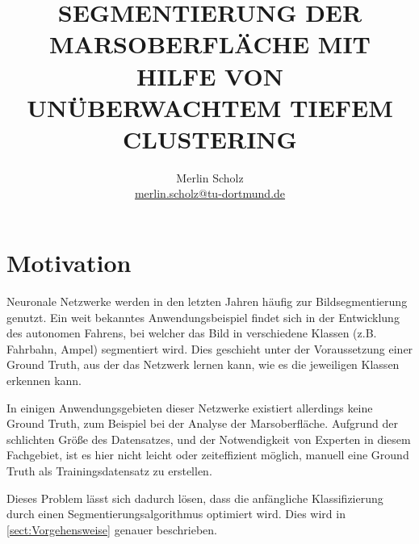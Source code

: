 \documentclass[a4paper,twocolumn,abstract,DIV=16]{scrartcl}
\title{\uppercase{Segmentierung der Marsoberfläche mit Hilfe von unüberwachtem tiefem Clustering}}
\author{Merlin Scholz\\\small\href{mailto:merlin.scholz@tu-dortmund.de}{merlin.scholz@tu-dortmund.de}}
\date{}
\begin{document}
%




\section{Motivation}

Neuronale Netzwerke werden in den letzten Jahren häufig zur Bildsegmentierung genutzt. Ein weit bekanntes Anwendungsbeispiel findet sich in der Entwicklung des autonomen Fahrens, bei welcher das Bild in verschiedene Klassen (z.B. Fahrbahn, Ampel) segmentiert wird. Dies geschieht unter der Voraussetzung einer Ground Truth, aus der das Netzwerk lernen kann, wie es die jeweiligen Klassen erkennen kann.

In einigen Anwendungsgebieten dieser Netzwerke existiert allerdings keine Ground Truth, zum Beispiel bei der Analyse der Marsoberfläche. Aufgrund der schlichten Größe des Datensatzes, und der Notwendigkeit von Experten in diesem Fachgebiet, ist es hier nicht leicht oder zeiteffizient möglich, manuell eine Ground Truth als Trainingsdatensatz zu erstellen.

Dieses Problem lässt sich dadurch lösen, dass die anfängliche Klassifizierung durch einen Segmentierungsalgorithmus optimiert wird. Dies wird in \autoref{sect:Vorgehensweise} genauer beschrieben.
\end{document}
